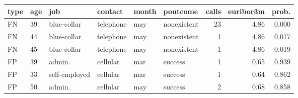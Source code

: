\begin{tabular}{llllllrrr}
\toprule
type & age & job & contact & month & poutcome & calls & euribor3m & prob. \\
\midrule
FN & 39 & blue-collar & telephone & may & nonexistent & 23 & 4.86 & 0.000 \\
FN & 44 & blue-collar & telephone & may & nonexistent & 1 & 4.86 & 0.017 \\
FN & 45 & blue-collar & telephone & may & nonexistent & 1 & 4.86 & 0.019 \\
FP & 39 & admin. & cellular & mar & success & 1 & 0.65 & 0.939 \\
FP & 33 & self-employed & cellular & mar & success & 1 & 0.64 & 0.862 \\
FP & 50 & admin. & cellular & may & success & 2 & 0.68 & 0.858 \\
\bottomrule
\end{tabular}